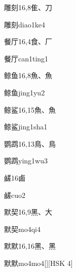 \begin{entry}{雕刻}{16,8}{⾫、⼑}
  \begin{phonetics}{雕刻}{diao1ke4}
  \end{phonetics}
\end{entry}

\begin{entry}{餐厅}{16,4}{⾷、⼚}
  \begin{phonetics}{餐厅}{can1ting1}
  \end{phonetics}
\end{entry}

\begin{entry}{鲸鱼}{16,8}{⿂、⿂}
  \begin{phonetics}{鲸鱼}{jing1yu2}
  \end{phonetics}
\end{entry}

\begin{entry}{鲸鲨}{16,15}{⿂、⿂}
  \begin{phonetics}{鲸鲨}{jing1sha1}
  \end{phonetics}
\end{entry}

\begin{entry}{鹦鹉}{16,13}{⿃、⿃}
  \begin{phonetics}{鹦鹉}{ying1wu3}
  \end{phonetics}
\end{entry}

\begin{entry}{鹾}{16}{⿄}
  \begin{phonetics}{鹾}{cuo2}
  \end{phonetics}
\end{entry}

\begin{entry}{默契}{16,9}{⿊、⼤}
  \begin{phonetics}{默契}{mo4qi4}
  \end{phonetics}
\end{entry}

\begin{entry}{默默}{16,16}{⿊、⿊}
  \begin{phonetics}{默默}{mo4mo4}[][HSK 4]
  \end{phonetics}
\end{entry}



